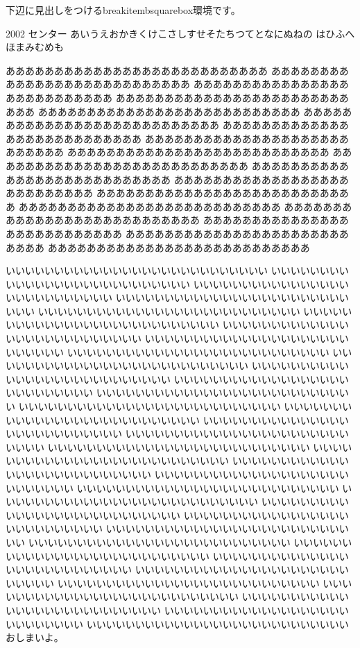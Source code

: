 \documentclass{jarticle}
\begin{document}
下辺に見出しをつける\textsf{breakitembsquarebox}環境です。

\begin{breakitembsquarebox}{2002 センター}
あいうえおかきくけこさしすせそたちつてとなにぬねの
はひふへほまみむめも

あああああああああああああああああああああああああああ
あああああああああああああああああああああああああああ
あああああああああああああああああああああああああああ
あああああああああああああああああああああああああああ
あああああああああああああああああああああああああああ
あああああああああああああああああああああああああああ
あああああああああああああああああああああああああああ
あああああああああああああああああああああああああああ
あああああああああああああああああああああああああああ
あああああああああああああああああああああああああああ
あああああああああああああああああああああああああああ
あああああああああああああああああああああああああああ
あああああああああああああああああああああああああああ
あああああああああああああああああああああああああああ
あああああああああああああああああああああああああああ
あああああああああああああああああああああああああああ
あああああああああああああああああああああああああああ
あああああああああああああああああああああああああああ

いいいいいいいいいいいいいいいいいいいいいいいいいいい
いいいいいいいいいいいいいいいいいいいいいいいいいいい
いいいいいいいいいいいいいいいいいいいいいいいいいいい
いいいいいいいいいいいいいいいいいいいいいいいいいいい
いいいいいいいいいいいいいいいいいいいいいいいいいいい
いいいいいいいいいいいいいいいいいいいいいいいいいいい
いいいいいいいいいいいいいいいいいいいいいいいいいいい
いいいいいいいいいいいいいいいいいいいいいいいいいいい
いいいいいいいいいいいいいいいいいいいいいいいいいいい
いいいいいいいいいいいいいいいいいいいいいいいいいいい
いいいいいいいいいいいいいいいいいいいいいいいいいいい
いいいいいいいいいいいいいいいいいいいいいいいいいいい
いいいいいいいいいいいいいいいいいいいいいいいいいいい
いいいいいいいいいいいいいいいいいいいいいいいいいいい
いいいいいいいいいいいいいいいいいいいいいいいいいいい
いいいいいいいいいいいいいいいいいいいいいいいいいいい
いいいいいいいいいいいいいいいいいいいいいいいいいいい
いいいいいいいいいいいいいいいいいいいいいいいいいいい
いいいいいいいいいいいいいいいいいいいいいいいいいいい
いいいいいいいいいいいいいいいいいいいいいいいいいいい
いいいいいいいいいいいいいいいいいいいいいいいいいいい
いいいいいいいいいいいいいいいいいいいいいいいいいいい
いいいいいいいいいいいいいいいいいいいいいいいいいいい
いいいいいいいいいいいいいいいいいいいいいいいいいいい
いいいいいいいいいいいいいいいいいいいいいいいいいいい
いいいいいいいいいいいいいいいいいいいいいいいいいいい
いいいいいいいいいいいいいいいいいいいいいいいいいいい
いいいいいいいいいいいいいいいいいいいいいいいいいいい
いいいいいいいいいいいいいいいいいいいいいいいいいいい
いいいいいいいいいいいいいいいいいいいいいいいいいいい
いいいいいいいいいいいいいいいいいいいいいいいいいいい
いいいいいいいいいいいいいいいいいいいいいいいいいいい
いいいいいいいいいいいいいいいいいいいいいいいいいいい
いいいいいいいいいいいいいいいいいいいいいいいいいいい
いいいいいいいいいいいいいいいいいいいいいいいいいいい
おしまいよ。
\end{breakitembsquarebox}
\end{document}
